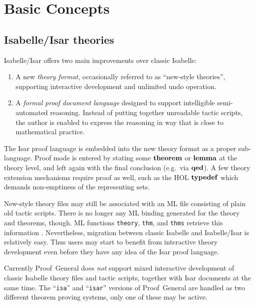 
\chapter{Basic Concepts}\label{ch:basics}

\section{Isabelle/Isar theories}

Isabelle/Isar offers two main improvements over classic Isabelle:
\begin{enumerate}
\item A new \emph{theory format}, occasionally referred to as ``new-style
  theories'', supporting interactive development and unlimited undo operation.
\item A \emph{formal proof document language} designed to support intelligible
  semi-automated reasoning.  Instead of putting together unreadable tactic
  scripts, the author is enabled to express the reasoning in way that is close
  to mathematical practice.
\end{enumerate}

The Isar proof language is embedded into the new theory format as a proper
sub-language.  Proof mode is entered by stating some ${\mathord{\mathbf{theorem}}}$ or
${\mathord{\mathbf{lemma}}}$ at the theory level, and left again with the final conclusion
(e.g.\ via ${\mathord{\mathbf{qed}}}$).  A few theory extension mechanisms require proof as
well, such as the HOL ${\mathord{\mathbf{typedef}}}$ which demands non-emptiness of
the representing sets.

New-style theory files may still be associated with an ML file consisting of
plain old tactic scripts.  There is no longer any ML binding generated for the
theory and theorems, though.  ML functions \texttt{theory}, \texttt{thm}, and
\texttt{thms} retrieve this information \cite{isabelle-ref}.  Nevertheless,
migration between classic Isabelle and Isabelle/Isar is relatively easy.  Thus
users may start to benefit from interactive theory development even before
they have any idea of the Isar proof language.

\begin{warn}
  Currently Proof~General does \emph{not} support mixed interactive
  development of classic Isabelle theory files and tactic scripts, together
  with Isar documents at the same time.  The ``\texttt{isa}'' and
  ``\texttt{isar}'' versions of Proof~General are handled as two different
  theorem proving systems, only one of these may be active.
\end{warn}

